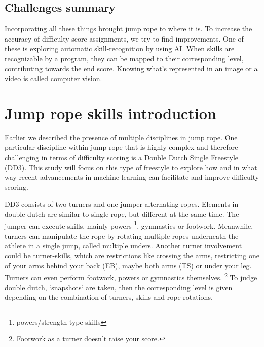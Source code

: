 \subsection{Challenges summary}
Incorporating all these things brought jump rope to where it is. To increase the accuracy of difficulty score assignments, we try to find improvements. One of these is exploring automatic skill-recognition by using AI. When skills are recognizable by a program, they can be mapped to their corresponding level, contributing towards the end score. Knowing what's represented in an image or a video is called computer vision. %

\section{Jump rope skills introduction}
\label{subsec:bp-literature-basisskills}

Earlier we described the presence of multiple disciplines in jump rope. One particular discipline within jump rope that is highly complex and therefore challenging in terms of difficulty scoring is a Double Dutch Single Freestyle (DD3). This study will focus on this type of freestyle to explore how and in what way recent advancements in machine learning can facilitate and improve difficulty scoring.

\medskip

DD3 consists of two turners and one jumper alternating ropes. Elements in double dutch are similar to single rope, but different at the same time. The jumper can execute skills, mainly powers \footnote{powers/strength type skills}, gymnastics or footwork. Meanwhile, turners can manipulate the rope by rotating multiple ropes underneath the athlete in a single jump, called multiple unders. Another turner involvement could be turner-skills, which are restrictions like crossing the arms, restricting one of your arms behind your back (EB), maybe both arms (TS) or under your leg. Turners can even perform footwork, powers or gymnastics themselves. \footnote{Footwork as a turner doesn't raise your score.}
To judge double dutch, `snapshots` are taken, then the corresponding level is given depending on the combination of turners, skills and rope-rotations.

